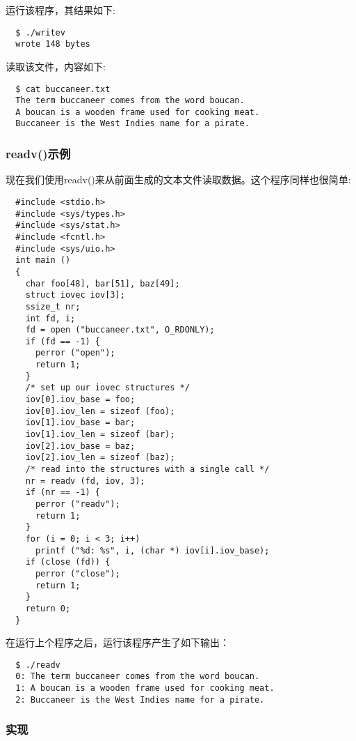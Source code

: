 运行该程序，其结果如下:

\begin{verbatim}
  $ ./writev
  wrote 148 bytes
\end{verbatim}

读取该文件，内容如下:

\begin{verbatim}
  $ cat buccaneer.txt
  The term buccaneer comes from the word boucan.
  A boucan is a wooden frame used for cooking meat.
  Buccaneer is the West Indies name for a pirate.
\end{verbatim}

\subsubsection{readv()示例}

现在我们使用readv()来从前面生成的文本文件读取数据。这个程序同样也很简单:

\begin{lstlisting}
  #include <stdio.h>
  #include <sys/types.h>
  #include <sys/stat.h>
  #include <fcntl.h>
  #include <sys/uio.h>
  int main ()
  {
    char foo[48], bar[51], baz[49];
    struct iovec iov[3];
    ssize_t nr;
    int fd, i;
    fd = open ("buccaneer.txt", O_RDONLY);
    if (fd == -1) {
      perror ("open");
      return 1;
    }
    /* set up our iovec structures */
    iov[0].iov_base = foo;
    iov[0].iov_len = sizeof (foo);
    iov[1].iov_base = bar;
    iov[1].iov_len = sizeof (bar);
    iov[2].iov_base = baz;
    iov[2].iov_len = sizeof (baz);
    /* read into the structures with a single call */
    nr = readv (fd, iov, 3);
    if (nr == -1) {
      perror ("readv");
      return 1;
    }
    for (i = 0; i < 3; i++)
      printf ("%d: %s", i, (char *) iov[i].iov_base);
    if (close (fd)) {
      perror ("close");
      return 1;
    }
    return 0;
  } 
\end{lstlisting}

在运行上个程序之后，运行该程序产生了如下输出：

\begin{verbatim} 
  $ ./readv
  0: The term buccaneer comes from the word boucan.
  1: A boucan is a wooden frame used for cooking meat.
  2: Buccaneer is the West Indies name for a pirate.
\end{verbatim}

\subsubsection{实现}

